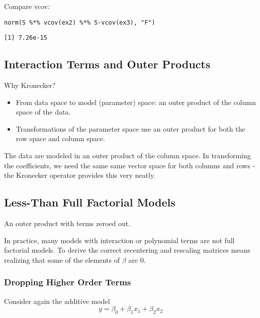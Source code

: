 \documentclass[]{article}
\providecommand{\tightlist}{%
  \setlength{\itemsep}{0pt}\setlength{\parskip}{0pt}}
\begin{document}
Compare vcov:

\begin{verbatim}
norm(S %*% vcov(ex2) %*% S-vcov(ex3), "F")
\end{verbatim}

\begin{verbatim}
[1] 7.26e-15
\end{verbatim}

\subsection{Interaction Terms and Outer
Products}\label{interaction-terms-and-outer-products}

Why Kronecker?

\begin{itemize}
\tightlist
\item
  From data space to model (parameter) space: an outer product of the
  column space of the data.
\item
  Transformations of the parameter space use an outer product for both
  the row space and column space.
\end{itemize}

The data are modeled in an outer product of the column space. In
transforming the coefficients, we need the same same vector space for
both columns and rows - the Kronecker operator provides this very
neatly.

\subsection{Less-Than Full Factorial
Models}\label{less-than-full-factorial-models}

An outer product with terms zeroed out.

In practice, many models with interaction or polynomial terms are not
full factorial models. To derive the correct recentering and rescaling
matrices means realizing that some of the elements of \(\beta\) are
\(0\).

\subsubsection{Dropping Higher Order
Terms}\label{dropping-higher-order-terms}

Consider again the additive model
\[y = \beta_0 + \beta_1x_1 + \beta_2x_2\]
\end{document}
